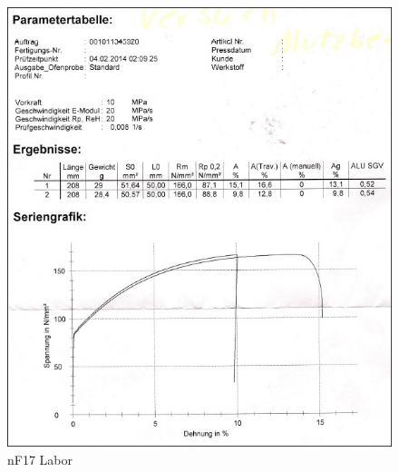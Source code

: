 \documentclass[12pt,a4paper,parskip]{scrartcl}
\begin{document}
\begin{figure}[hbtp]
\centering
\includegraphics[width=1\textwidth]{nF17Labor.jpg}
\caption{nF17 Labor}
\end{figure}
\end{document}
